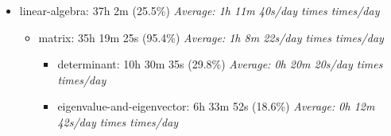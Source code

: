 \documentclass[12pt]{extarticle}
\begin{document}
\begin{itemize}[topsep=0pt, itemsep=-0.5ex]
\begin{itemize}[topsep=0pt, itemsep=-0.5ex]
\begin{itemize}[topsep=0pt, itemsep=-0.5ex]
\begin{itemize}[topsep=0pt, itemsep=-0.5ex]
        \textit{Average: 0h 22m 1s/day  times  times/day}\par
    \item discrete-random-variable: 3h 51m 3s (24.8\%)
        \textit{Average: 0h 7m 27s/day  times  times/day}\par
\end{itemize}
    \item probability-basics: 14h 46m 36s (20.2\%)
        \textit{Average: 0h 28m 36s/day  times  times/day}\par
\begin{itemize}[topsep=0pt, itemsep=-0.5ex]
    \item random-events: 4h 9m 37s (28.2\%)
        \textit{Average: 0h 8m 3s/day  times  times/day}\par
    \item probability-operations: 4h 6m 14s (27.8\%)
        \textit{Average: 0h 7m 56s/day  times  times/day}\par
    \item conditional-probability: 2h 25m 22s (16.4\%)
        \textit{Average: 0h 4m 41s/day  times  times/day}\par
\end{itemize}
\end{itemize}
    \item linear-algebra: 37h 2m (25.5\%)
        \textit{Average: 1h 11m 40s/day  times  times/day}\par
\begin{itemize}[topsep=0pt, itemsep=-0.5ex]
    \item matrix: 35h 19m 25s (95.4\%)
        \textit{Average: 1h 8m 22s/day  times  times/day}\par
\begin{itemize}[topsep=0pt, itemsep=-0.5ex]
    \item determinant: 10h 30m 35s (29.8\%)
        \textit{Average: 0h 20m 20s/day  times  times/day}\par
    \item eigenvalue-and-eigenvector: 6h 33m 52s (18.6\%)
        \textit{Average: 0h 12m 42s/day  times  times/day}\par

\end{itemize}
\end{itemize}
\end{itemize}
\end{itemize}
\end{document}

